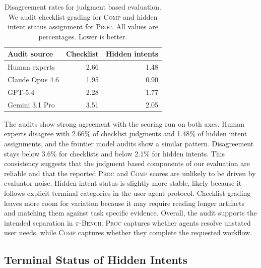 \documentclass{llmxive}
\providecommand{\bench}{\textsc{$\pi$-Bench}}
\begin{document}
\begin{table}[!htbp]
\centering
\begin{tabular}{lrr}
\toprule[1.25pt]
\textbf{Audit source} &
\textbf{Checklist} &
\textbf{Hidden intents} \\
\midrule[0.75pt]
Human experts & 2.66 & 1.48 \\
Claude Opus 4.6 & 1.95 & 0.90 \\
GPT-5.4 & 2.28 & 1.77 \\
Gemini 3.1 Pro & 3.51 & 2.05 \\
\bottomrule[1.25pt]
\end{tabular}
\vspace{-4pt}
\caption{Disagreement rates for judgment based evaluation. We audit checklist grading for \textsc{Comp} and hidden intent status assignment for \textsc{Proc}. All values are percentages. Lower is better.}
\label{tab:judge_reliability}
\end{table}

The audits show strong agreement with the scoring run on both axes. Human experts disagree with 2.66\% of checklist judgments and 1.48\% of hidden intent assignments, and the frontier model audits show a similar pattern. Disagreement stays below 3.6\% for checklists and below 2.1\% for hidden intents. This consistency suggests that the judgment based components of our evaluation are reliable and that the reported \textsc{Proc} and \textsc{Comp} scores are unlikely to be driven by evaluator noise. Hidden intent status is slightly more stable, likely because it follows explicit terminal categories in the user agent protocol. Checklist grading leaves more room for variation because it may require reading longer artifacts and matching them against task specific evidence. Overall, the audit supports the intended separation in {\bench}. \textsc{Proc} captures whether agents resolve unstated user needs, while \textsc{Comp} captures whether they complete the requested workflow.

\subsection{Terminal Status of Hidden Intents}
\label{app:hidden_intents_status}
\end{document}
